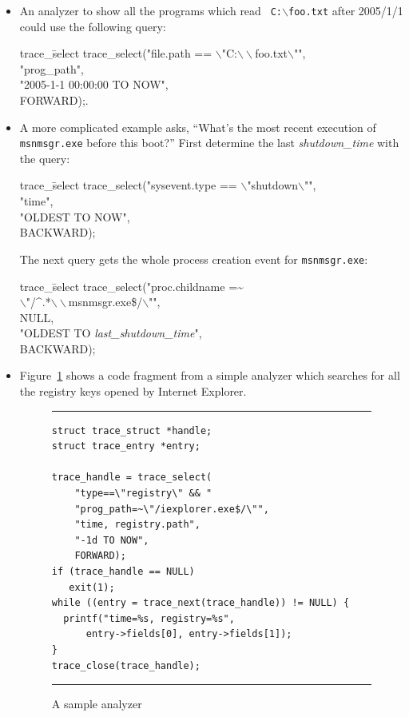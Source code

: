 \begin{itemize}

\item An analyzer to show all the programs which read {\tt
C:$\backslash$foo.txt} after 2005/1/1 could use the following
query:

{\small\tt \begin{tabbing}
trace\_\=select \kill
trace\_select("file.path == $\backslash$"C:$\backslash\backslash$foo.txt$\backslash$"", \\
	\>"prog\_path", \\
	\>"2005-1-1 00:00:00 TO NOW", \\
	\>FORWARD);.
\end{tabbing}}

\item A more complicated example asks, ``What's the most recent execution of
{\tt msnmsgr.exe} before this boot?''  First determine the last {\it
shutdown\_time} with the query:

{\small\tt \begin{tabbing}
trace\_\=select \kill
trace\_select("sysevent.type == $\backslash$"shutdown$\backslash$"", \\
	\>"time", \\
	\>"OLDEST TO NOW", \\
	\>BACKWARD);
\end{tabbing}}

The next query gets the whole process creation event
for {\small\tt msnmsgr.exe}: 

{\small\tt \begin{tabbing}
trace\_\=select \kill
trace\_select("proc.childname =\~{} \\
	\>$\backslash$"/\^{}.*$\backslash\backslash$msnmsgr.exe\$/$\backslash$"", \\
	\>NULL, \\
	\>"OLDEST TO {\it last\_shutdown\_time}", \\
	\>BACKWARD);
\end{tabbing}}

\item Figure~\ref{analyzer-prog} shows a code fragment from a simple analyzer
which searches for all the registry keys opened by Internet Explorer.

\begin{figure}[htb]
\small
\hrule
\medskip
\begin{verbatim}
struct trace_struct *handle;
struct trace_entry *entry;

trace_handle = trace_select(
    "type==\"registry\" && "
    "prog_path=~\"/iexplorer.exe$/\"",
    "time, registry.path",
    "-1d TO NOW",
    FORWARD);
if (trace_handle == NULL)
   exit(1);
while ((entry = trace_next(trace_handle)) != NULL) {
  printf("time=%s, registry=%s",
      entry->fields[0], entry->fields[1]);
}
trace_close(trace_handle);
\end{verbatim}
\hrule
\caption{A sample analyzer}
\label{analyzer-prog}
\end{figure}


\end{itemize}
